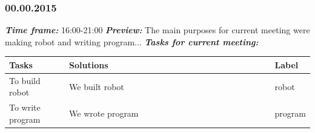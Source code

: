 \subsubsection{00.00.2015}
	\textit{\textbf{Time frame:}} 16:00-21:00 \newline
	\textit{\textbf{Preview:}} The main purposes for current meeting were making robot and writing program...\newline \newline
	\textit{\textbf{Tasks for current meeting:}}

  \begin{table}[H]
	\vspace{-2mm}
	\begin{center}
		\begin{tabular}{|p{0.2\linewidth}|p{0.7\linewidth}|p{0.1\linewidth}|}
			\hline
			Tasks & Solutions & Label \\
			\hline
			To build robot & We built robot & robot \\
			\hline
			To write program & We wrote program & program \\
			\hline
		\end{tabular}
	\end{center}
  \end{table}
  
